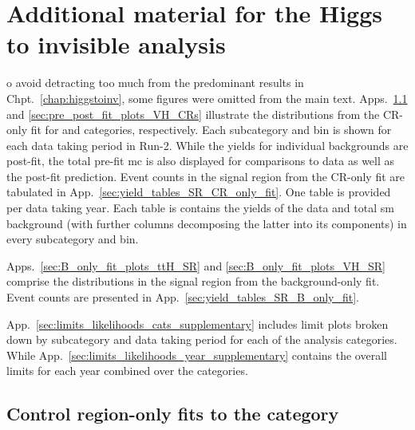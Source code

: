\chapter{Additional material for the Higgs to invisible analysis}
\label{app:supplementary_hinv_plots}

o avoid detracting too much from the predominant results in Chpt.~\ref{chap:higgstoinv}, some figures were omitted from the main text. Apps.~\ref{sec:pre_post_fit_plots_ttH_CRs} and \ref{sec:pre_post_fit_plots_VH_CRs} illustrate the distributions from the \gls{CR}-only fit for \ttH and \VH categories, respectively. Each subcategory and \ptmiss bin is shown for each data taking period in Run-2. While the yields for individual backgrounds are post-fit, the total pre-fit \acrshort{mc} is also displayed for comparisons to data as well as the post-fit prediction. Event counts in the signal region from the \gls{CR}-only fit are tabulated in App.~\ref{sec:yield_tables_SR_CR_only_fit}. One table is provided per data taking year. Each table is contains the yields of the data and total \acrshort{sm} background (with further columns decomposing the latter into its components) in every subcategory and \ptmiss bin.

Apps.~\ref{sec:B_only_fit_plots_ttH_SR} and \ref{sec:B_only_fit_plots_VH_SR} comprise the distributions in the signal region from the background-only fit. Event counts are presented in App.~\ref{sec:yield_tables_SR_B_only_fit}.

App.~\ref{sec:limits_likelihoods_cats_supplementary} includes limit plots broken down by subcategory and data taking period for each of the analysis categories. While App.~\ref{sec:limits_likelihoods_year_supplementary} contains the overall limits for each year combined over the categories.




\section{Control region-only fits to the \texorpdfstring{\ttH}{ttH} category}
\label{sec:pre_post_fit_plots_ttH_CRs}

